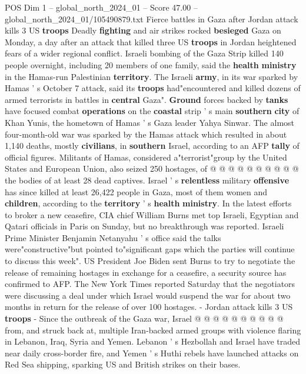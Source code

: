 \begin{textsample}{POS Dim 1 – global\_north\_2024\_01 – Score 47.00 – global\_north\_2024\_01/105490879.txt}  \label{ex:f1_pos_153}
Fierce battles in Gaza after Jordan attack kills 3 US \textbf{troops} Deadly \textbf{fighting} and air strikes rocked \textbf{besieged} Gaza on Monday, a day after an attack that killed three US \textbf{troops} in Jordan heightened fears of a wider regional conflict.
Israeli bombing of the Gaza Strip killed 140 people overnight, including 20 members of one family, said the \textbf{health} \textbf{ministry} in the Hamas-run Palestinian \textbf{territory}.
The Israeli \textbf{army}, in its war sparked by Hamas ' s October 7 attack, said its \textbf{troops} had"encountered and killed dozens of armed terrorists in battles in \textbf{central} Gaza". \textbf{Ground} forces backed by \textbf{tanks} have focused combat \textbf{operations} on the \textbf{coastal} strip ' s main \textbf{southern} \textbf{city} of Khan Yunis, the hometown of Hamas ' s Gaza leader Yahya Sinwar.
The almost four-month-old war was sparked by the Hamas attack which resulted in about 1,140 deaths, mostly \textbf{civilians}, in \textbf{southern} Israel, according to an AFP \textbf{tally} of official figures.
Militants of Hamas, considered a"terrorist"group by the United States and European Union, also seized 250 hostages, of @ @ @ @ @ @ @ @ @ @ the bodies of at least 28 dead captives.
Israel ' s \textbf{relentless} military \textbf{offensive} has since killed at least 26,422 people in Gaza, most of them women and \textbf{children}, according to the \textbf{territory} ' s \textbf{health} \textbf{ministry}.
In the latest efforts to broker a new ceasefire, CIA chief William Burns met top Israeli, Egyptian and Qatari officials in Paris on Sunday, but no breakthrough was reported.
Israeli Prime Minister Benjamin Netanyahu ' s office said the talks were"constructive"but pointed to"significant gaps which the parties will continue to discuss this week".
US President Joe Biden sent Burns to try to negotiate the release of remaining hostages in exchange for a ceasefire, a security source has confirmed to AFP.
The New York Times reported Saturday that the negotiators were discussing a deal under which Israel would suspend the war for about two months in return for the release of over 100 hostages. - Jordan attack kills 3 US \textbf{troops} - Since the outbreak of the Gaza war, Israel @ @ @ @ @ @ @ @ @ @ from, and struck back at, multiple Iran-backed armed groups with violence flaring in Lebanon, Iraq, Syria and Yemen.
Lebanon ' s Hezbollah and Israel have traded near daily cross-border fire, and Yemen ' s Huthi rebels have launched attacks on Red Sea shipping, sparking US and British strikes on their bases.

\end{textsample}
